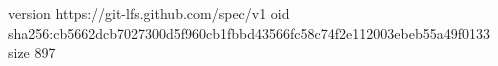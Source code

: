 version https://git-lfs.github.com/spec/v1
oid sha256:cb5662dcb7027300d5f960cb1fbbd43566fc58c74f2e112003ebeb55a49f0133
size 897
